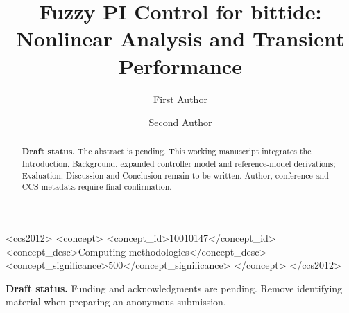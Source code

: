 \documentclass[sigconf]{acmart}
\begin{document}
\title[Fuzzy PI Control for bittide]{Fuzzy PI Control for bittide: Nonlinear Analysis and Transient Performance}

\author{First Author}

\author{Second Author}

\renewcommand{\shortauthors}{First Author and Second Author}

\begin{abstract}
\textbf{Draft status.} The abstract is pending. This working manuscript
integrates the Introduction, Background, expanded controller model and
reference-model derivations; Evaluation, Discussion and Conclusion remain
to be written. Author, conference and CCS metadata require final confirmation.
\end{abstract}


\begin{CCSXML}
<ccs2012>
 <concept>
  <concept_id>10010147</concept_id>
  <concept_desc>Computing methodologies</concept_desc>
  <concept_significance>500</concept_significance>
 </concept>
</ccs2012>
\end{CCSXML}

\maketitle









\begin{acks}
\textbf{Draft status.} Funding and acknowledgments are pending. Remove
identifying material when preparing an anonymous submission.
\end{acks}



\end{document}
